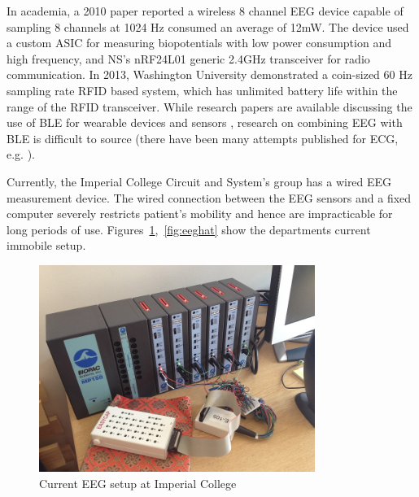 \documentclass[]{article}
\begin{document}
In academia, a 2010  paper reported a wireless 8 channel \ac{EEG} device capable of sampling 8 channels at 1024 Hz consumed an average of 12mW\cite{Brown2010}. The device used a custom \ac{ASIC} for measuring biopotentials with low power consumption and high frequency, and \ac{NS}'s nRF24L01 generic 2.4GHz transceiver for radio communication. In 2013, Washington University \cite{Dementyev2013} demonstrated a coin-sized 60 Hz sampling rate \ac{RFID} based system, which has unlimited battery life within the range of the \ac{RFID} transceiver.  While research papers are available discussing the use of \ac{BLE} for wearable devices and sensors \cite{Omre2010} \cite{MacKensen2012}, research on combining \ac{EEG} with \ac{BLE} is difficult to source (there have been many attempts published for \ac{ECG}, e.g. \cite{Yu2012}).

Currently, the Imperial College Circuit and System's group has a wired \ac{EEG} measurement device. The wired connection between the \ac{EEG} sensors and a fixed computer severely restricts patient's mobility and hence are impracticable for long periods of use. Figures~\ref{fig:imperialcurrent},~\ref{fig:eeghat} show the departments current immobile setup. 

\begin{figure}[H]
	\begin{center}
		\includegraphics[width = 0.8\textwidth]{imperialcurrent}
	\end{center}
	\caption{Current \ac{EEG} setup at Imperial College}
	\label{fig:imperialcurrent}
\end{figure}
\end{document}
